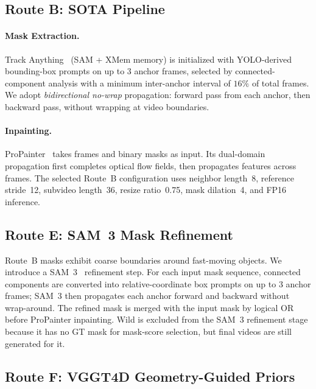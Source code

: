 \subsection{Route B: SOTA Pipeline}
\label{sec:method:b}

\paragraph{Mask Extraction.}
Track Anything~\cite{trackanything} (SAM + XMem memory) is initialized with
YOLO-derived bounding-box prompts on up to 3 anchor frames, selected by connected-component
analysis with a minimum inter-anchor interval of $16\%$ of total frames.
We adopt \emph{bidirectional no-wrap} propagation: forward pass from each anchor,
then backward pass, without wrapping at video boundaries.

\paragraph{Inpainting.}
ProPainter~\cite{propainter} takes frames and binary masks as input.
Its dual-domain propagation first completes optical flow fields, then propagates
features across frames. The selected Route~B configuration uses neighbor length~8,
reference stride~12, subvideo length~36, resize ratio~0.75, mask dilation~4, and
FP16 inference.

\subsection{Route E: SAM~3 Mask Refinement}
\label{sec:method:e}

Route~B masks exhibit coarse boundaries around fast-moving objects.
We introduce a SAM~3~\cite{sam3} refinement step. For each input mask sequence, connected
components are converted into relative-coordinate box prompts on up to 3 anchor frames;
SAM~3 then propagates each anchor forward and backward without wrap-around. The refined
mask is merged with the input mask by logical OR before ProPainter inpainting. Wild is
excluded from the SAM~3 refinement stage because it has no GT mask for mask-score
selection, but final videos are still generated for it.

\subsection{Route F: VGGT4D Geometry-Guided Priors}
\label{sec:method:f}

